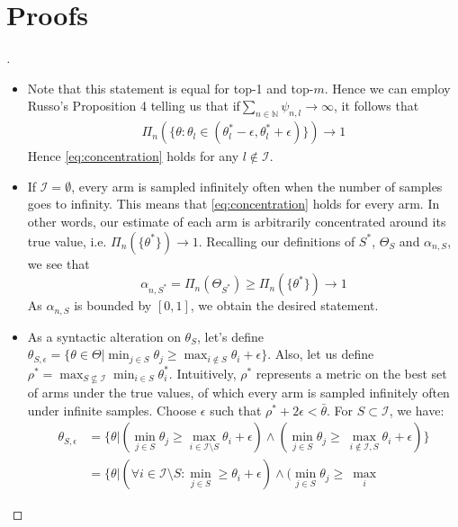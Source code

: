 \section{Proofs}\label{section:txts_proofs}
\begin{proof}[]

  \begin{itemize}
  \item Note that this statement is equal for top-1 and top-$m$. Hence we can
  employ Russo's Proposition 4 telling us that if$\sum_{n \in \mathbb{N}}
  \psi_{n, l} \rightarrow \infty$, it follows that
  \begin{align}
    \Pi_n(\{\theta: \theta_l \in (\theta^*_l - \epsilon, \theta^*_l +
        \epsilon)\}) \rightarrow 1 \label{eq:concentration}
  \end{align}
  Hence \eqref{eq:concentration} holds for any $l \notin \mathcal{I}$. \item If
  $\mathcal{I} = \emptyset$, every arm is sampled infinitely often when the
  number of samples goes to infinity. This means that \eqref{eq:concentration}
  holds for every arm. In other words, our estimate of each arm is arbitrarily
  concentrated around its true value, i.e. $\Pi_n(\{\theta^*\}) \rightarrow 1$.
  Recalling our definitions of $S^*$, $\Theta_S$ and $\alpha_{n, S}$, we see
  that
  \[ \alpha_{n, S^*} = \Pi_n(\Theta_{S^*}) \geq \Pi_n(\{\theta^*\}) \rightarrow
      1\]
  As $\alpha_{n, S}$ is bounded by $[0, 1]$, we obtain the desired statement.
  \item As a syntactic alteration on $\theta_S$, let's define $\theta_{S,
  \epsilon} = \{\theta \in \Theta | \min_{j \in S} \theta_j \geq \max_{i \notin
  S} \theta_i + \epsilon\}$. Also, let us define $\rho^* = \max_{S \not\subseteq
  \mathcal{I}} \min_{i \in S} \theta^*_i$. Intuitively, $\rho^*$ represents a
  metric on the best set of arms under the true values, of which every arm is
  sampled infinitely often under infinite samples. Choose $\epsilon$ such that
  $\rho^* + 2\epsilon < \bar{\theta}$. For $S \subset \mathcal{I}$, we have:
  \begin{align}
    \theta_{S, \epsilon} &= \{\theta|(\min_{j \in S} \theta_j \geq \max_{i \in
        \mathcal{I} \setminus S} \theta_i + \epsilon) \wedge (\min_{j \in S}
        \theta_j \geq\ \max_{i \notin \mathcal{I}, S} \theta_i + \epsilon)\} \\
      &= \{\theta | (\forall i \in \mathcal{I} \setminus S: \min_{j \in S} \geq
          \theta_i + \epsilon) \wedge (\min_{j \in S} \theta_j \geq\ \max_{i
}
\end{align}
\end{itemize}
\end{proof}
